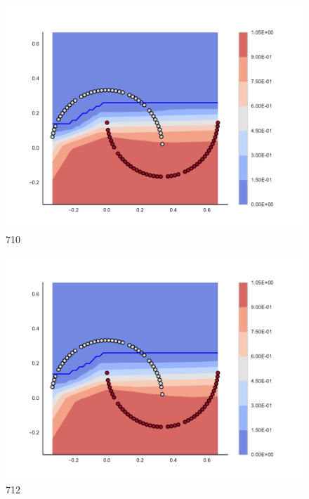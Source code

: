 \begin{subfigure}[b]{0.09\textwidth}
    \includegraphics[clip, trim=2.35cm 1.75cm 4.5cm 0cm,width=\textwidth]{img/convergence/710.pdf}
    \caption{710}
    \label{fig:convergence_710}
\end{subfigure}
%
\begin{subfigure}[b]{0.09\textwidth}
    \includegraphics[clip, trim=2.35cm 1.75cm 4.5cm 0cm,width=\textwidth]{img/convergence/712.pdf}
    \caption{712}
    \label{fig:convergence_712}
\end{subfigure}
%
